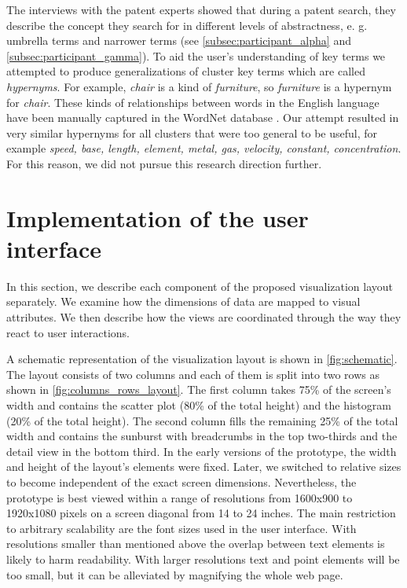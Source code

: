 The interviews with the patent experts showed that during a patent search, they describe the concept they search for in different levels of abstractness, e. g. umbrella terms and narrower terms (see \autoref{subsec:participant_alpha} and \autoref{subsec:participant_gamma}).
To aid the user's understanding of key terms we attempted to produce generalizations of cluster key terms which are called \textit{hypernyms}.
For example, \textit{chair} is a kind of \textit{furniture}, so \textit{furniture} is a hypernym for \textit{chair}.
These kinds of relationships between words in the English language have been manually captured in the WordNet database \cite{wordnet}.
Our attempt resulted in very similar hypernyms for all clusters that were too general to be useful, for example \textit{speed, base, length, element, metal, gas, velocity, constant, concentration}.
For this reason, we did not pursue this research direction further.

\section{Implementation of the user interface}
\label{sec:user_interface_concept}

In this section, we describe each component of the proposed visualization layout separately.
We examine how the dimensions of data are mapped to visual attributes.
We then describe how the views are coordinated through the way they react to user interactions.

A schematic representation of the visualization layout is shown in \autoref{fig:schematic}.
The layout consists of two columns and each of them is split into two rows as shown in \autoref{fig:columns_rows_layout}.
The first column takes 75\% of the screen's width and contains the scatter plot (80\% of the total height) and the histogram (20\% of the total height).
The second column fills the remaining 25\% of the total width and contains the sunburst with breadcrumbs in the top two-thirds and the detail view in the bottom third.
In the early versions of the prototype, the width and height of the layout's elements were fixed.
Later, we switched to relative sizes to become independent of the exact screen dimensions.
Nevertheless, the prototype is best viewed within a range of resolutions from 1600x900 to 1920x1080 pixels on a screen diagonal from 14 to 24 inches.
The main restriction to arbitrary scalability are the font sizes used in the user interface.
With resolutions smaller than mentioned above the overlap between text elements is likely to harm readability.
With larger resolutions text and point elements will be too small, but it can be alleviated by magnifying the whole web page.

